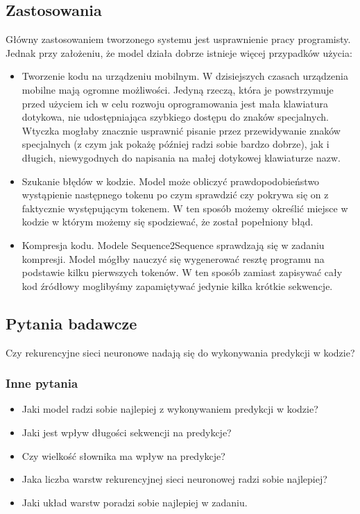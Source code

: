 \subsection {Zastosowania}
Główny zastosowaniem tworzonego systemu jest usprawnienie pracy programisty. Jednak przy założeniu, że model działa dobrze 
istnieje więcej przypadków użycia: 
\begin{itemize}
	\item Tworzenie kodu na urządzeniu mobilnym. W dzisiejszych czasach urządzenia mobilne mają ogromne możliwości. 
	Jedyną rzeczą, która je powstrzymuje przed użyciem ich w celu rozwoju oprogramowania jest mała klawiatura dotykowa, nie
	udostępniająca szybkiego dostępu do znaków specjalnych. Wtyczka mogłaby znacznie usprawnić pisanie przez przewidywanie znaków 
	specjalnych (z czym jak pokażę później radzi sobie bardzo dobrze), jak i długich, niewygodnych do napisania na małej dotykowej klawiaturze nazw.

	\item Szukanie błędów w kodzie. Model może obliczyć prawdopodobieństwo wystąpienie następnego tokenu po czym sprawdzić czy 
	pokrywa się on z faktycznie występującym tokenem. W ten sposób możemy określić miejsce w kodzie w którym możemy się 
	spodziewać, że został popełniony błąd. 

	\item Kompresja kodu. Modele Sequence2Sequence sprawdzają się w zadaniu kompresji. Model mógłby nauczyć się wygenerować resztę programu 
	na podstawie kilku pierwszych tokenów. W ten sposób zamiast zapisywać cały kod źródłowy moglibyśmy zapamiętywać jedynie kilka 
	krótkie sekwencje. 
\end{itemize}

\subsection {Pytania badawcze}
Czy rekurencyjne sieci neuronowe nadają się do wykonywania predykcji w kodzie?
\subsubsection {Inne pytania}
\begin{itemize}
	\item Jaki model radzi sobie najlepiej z wykonywaniem predykcji w kodzie? 
	\item Jaki jest wpływ długości sekwencji na predykcje? 
	\item Czy wielkość słownika ma wpływ na predykcje? 
	\item Jaka liczba warstw rekurencyjnej sieci neuronowej radzi sobie najlepiej? 
	\item Jaki układ warstw poradzi sobie najlepiej w zadaniu. 
\end{itemize} 



